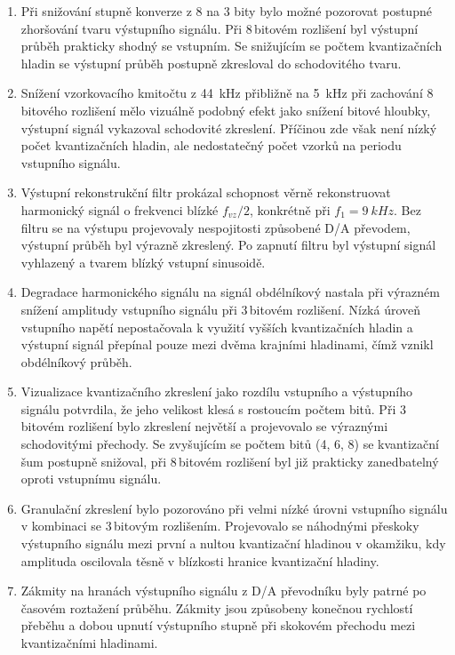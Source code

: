 \documentclass[a4paper, czech]{article}
\begin{document}
\begin{enumerate}

\item Při snižování stupně konverze z 8 na 3 bity bylo možné pozorovat postupné zhoršování tvaru výstupního signálu.
Při 8\,bitovém rozlišení byl výstupní průběh prakticky shodný se vstupním.
Se snižujícím se počtem kvantizačních hladin se výstupní průběh postupně zkresloval do schodovitého tvaru.

\item Snížení vzorkovacího kmitočtu z \SI{44}{kHz} přibližně na \SI{5}{kHz} při zachování 8\,bitového rozlišení mělo vizuálně podobný efekt jako snížení bitové hloubky, výstupní signál vykazoval schodovité zkreslení.
Příčinou zde však není nízký počet kvantizačních hladin, ale nedostatečný počet vzorků na periodu vstupního signálu.

\item Výstupní rekonstrukční filtr prokázal schopnost věrně rekonstruovat harmonický signál o frekvenci blízké $f_{vz}/2$, konkrétně při $f_1 = \SI{9}{kHz}$.
Bez filtru se na výstupu projevovaly nespojitosti způsobené D/A převodem, výstupní průběh byl výrazně zkreslený.
Po zapnutí filtru byl výstupní signál vyhlazený a tvarem blízký vstupní sinusoidě.

\item Degradace harmonického signálu na signál obdélníkový nastala při výrazném snížení amplitudy vstupního signálu při 3\,bitovém rozlišení.
Nízká úroveň vstupního napětí nepostačovala k využití vyšších kvantizačních hladin a výstupní signál přepínal pouze mezi dvěma krajními hladinami, čímž vznikl obdélníkový průběh.

\item Vizualizace kvantizačního zkreslení jako rozdílu vstupního a výstupního signálu potvrdila, že jeho velikost klesá s rostoucím počtem bitů.
Při 3\,bitovém rozlišení bylo zkreslení největší a projevovalo se výraznými schodovitými přechody.
Se zvyšujícím se počtem bitů (4, 6, 8) se kvantizační šum postupně snižoval, při 8\,bitovém rozlišení byl již prakticky zanedbatelný oproti vstupnímu signálu.

\item Granulační zkreslení bylo pozorováno při velmi nízké úrovni vstupního signálu v kombinaci se 3\,bitovým rozlišením.
Projevovalo se náhodnými přeskoky výstupního signálu mezi první a nultou kvantizační hladinou v okamžiku, kdy amplituda oscilovala těsně v blízkosti hranice kvantizační hladiny.

\item Zákmity na hranách výstupního signálu z D/A převodníku byly patrné po časovém roztažení průběhu.
Zákmity jsou způsobeny konečnou rychlostí přeběhu a dobou upnutí výstupního stupně při skokovém přechodu mezi kvantizačními hladinami.


\end{enumerate}
\end{document}
